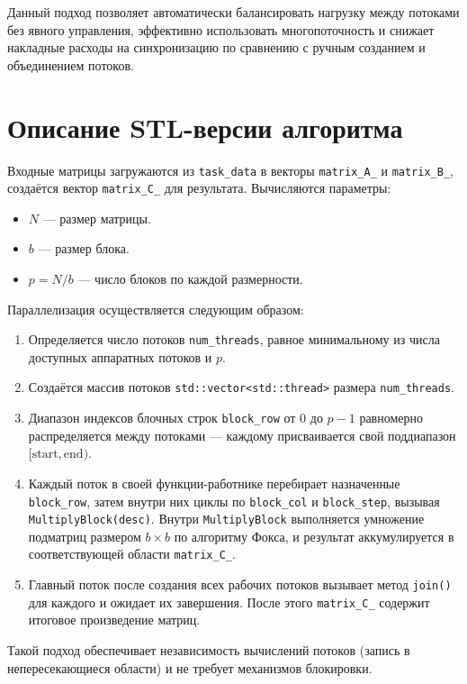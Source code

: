 \documentclass[14pt,a4paper]{extarticle}
\begin{document}
Данный подход позволяет автоматически балансировать нагрузку между потоками без явного управления, эффективно использовать многопоточность и снижает накладные расходы на синхронизацию по сравнению с ручным созданием и объединением потоков.
\newpage

\section{Описание STL-версии алгоритма}

Входные матрицы загружаются из \texttt{task\_data} в векторы \texttt{matrix\_A\_} и \texttt{matrix\_B\_}, создаётся вектор \texttt{matrix\_C\_} для результата. Вычисляются параметры:
\begin{itemize}
  \item $N$ — размер матрицы.
  \item $b$ — размер блока.
  \item $p = N / b$ — число блоков по каждой размерности.
\end{itemize}

Параллелизация осуществляется следующим образом:
\begin{enumerate}
  \item Определяется число потоков \texttt{num\_threads}, равное минимальному из числа доступных аппаратных потоков и $p$.
  \item Создаётся массив потоков \texttt{std::vector<std::thread>} размера \texttt{num\_threads}.
  \item Диапазон индексов блочных строк \texttt{block\_row} от $0$ до $p-1$ равномерно распределяется между потоками — каждому присваивается свой поддиапазон $[\text{start}, \text{end})$.
  \item Каждый поток в своей функции-работнике перебирает назначенные \texttt{block\_row}, затем внутри них циклы по \texttt{block\_col} и \texttt{block\_step}, вызывая \texttt{MultiplyBlock(desc)}. Внутри \texttt{MultiplyBlock} выполняется умножение подматриц размером $b\times b$ по алгоритму Фокса, и результат аккумулируется в соответствующей области \texttt{matrix\_C\_}.
  \item Главный поток после создания всех рабочих потоков вызывает метод \texttt{join()} для каждого и ожидает их завершения. После этого \texttt{matrix\_C\_} содержит итоговое произведение матриц.
\end{enumerate}

Такой подход обеспечивает независимость вычислений потоков (запись в непересекающиеся области) и не требует механизмов блокировки.
\newpage
\end{document}

